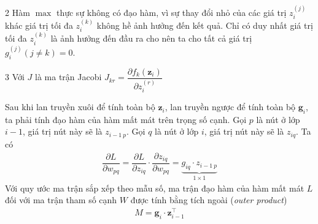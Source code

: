 \begin{table}[htbp]
\begin{threeparttable}
\begin{tablenotes}
            \item[2] Hàm $\max$ thực sự không có đạo hàm, vì sự thay đổi nhỏ của các giá trị $z_i^{(j)}$ khác giá trị tối đa $z_i^{(k)}$ không hề ảnh hưởng đến kết quả. Chỉ có duy nhất giá trị tối đa $z_i^{(k)}$ là ảnh hưởng đến đầu ra cho nên ta cho tất cả giá trị $g_i^{(j)}(j\neq k)=0$.
            \item[3] Với $J$ là ma trận Jacobi $J_{kr}=\dfrac{\partial f_k(\mathbf z_i)}{\partial z_i^{(r)}}$
        \end{tablenotes}
    \end{threeparttable}
\end{table}

Sau khi lan truyền xuôi để tính toàn bộ $\mathbf z_i$, lan truyền ngược để tính toàn bộ $\mathbf g_i$, ta phải tính đạo hàm của hàm mất mát trên trọng số cạnh. Gọi $p$ là nút ở lớp $i-1$, giá trị nút này sẽ là $z_{i-1\ p}$. Gọi $q$ là nút ở lớp $i$, giá trị nút này sẽ là $z_{iq}$. Ta có
\begin{align}
    \dfrac{\partial L}{\partial w_{pq}}=\dfrac{\partial L}{\partial z_{iq}}\cdot\dfrac{\partial z_{iq}}{\partial w_{pq}}=\underbrace{g_{iq}\cdot z_{i-1\ p}}_{1\times 1}
\end{align}
Với quy ước ma trận sắp xếp theo mẫu số, ma trận đạo hàm của hàm mất mát $L$ đối với ma trận tham số cạnh $W$ được tính bằng tích ngoài (\textit{outer product}) \cite{Aggarwal2023}
\begin{align}
    M=\mathbf g_i\cdot\mathbf  z_{i-1}^\intercal
\end{align}
